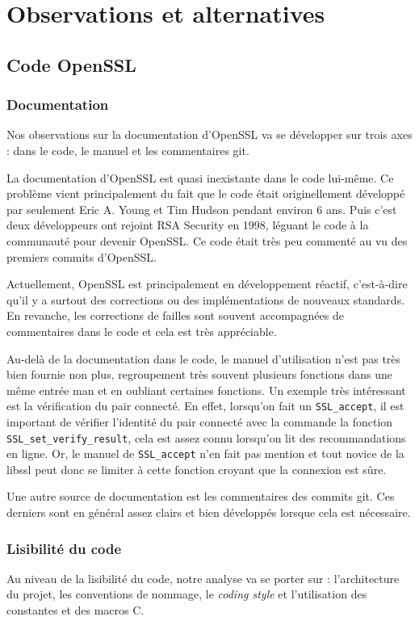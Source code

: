 \chapter{Observations et alternatives}
\section{Code OpenSSL}

\subsection{Documentation}
Nos observations sur la documentation d'OpenSSL va se développer sur trois axes : dans le code, le manuel et les commentaires git.

La documentation d'OpenSSL est quasi inexistante dans le code lui-même. 
Ce problème vient principalement du fait que le code était originellement développé par seulement Eric A. Young et Tim Hudson pendant environ 6 ans. Puis c'est deux développeurs ont rejoint RSA Security en 1998, léguant le code à la communauté pour devenir OpenSSL. Ce code était très peu commenté au vu des premiers commits d'OpenSSL. 

Actuellement, OpenSSL est principalement en développement réactif, c'est-à-dire qu'il y a surtout des corrections ou des implémentations de nouveaux standards. En revanche, les corrections de failles sont souvent accompagnées de commentaires dans le code et cela est très appréciable.

Au-delà de la documentation dans le code, le manuel d'utilisation n'est pas très bien fournie non plus, regroupement très souvent plusieurs fonctions dans une même entrée man et en oubliant certaines fonctions. Un exemple très intéressant est la vérification du pair connecté. En effet, lorsqu'on fait un \verb+SSL_accept+, il est important de vérifier l'identité du pair connecté avec la commande la fonction \verb+SSL_set_verify_result+, cela est assez connu lorsqu'on lit des recommandations en ligne. Or, le manuel de \verb+SSL_accept+ n'en fait pas mention et tout novice de la libssl peut donc se limiter à cette fonction croyant que la connexion est sûre.

Une autre source de documentation est les commentaires des commits git. Ces derniers sont en général assez clairs et bien développés lorsque cela est nécessaire.

\subsection{Lisibilité du code}
Au niveau de la lisibilité du code, notre analyse va se porter sur : l'architecture du projet, les conventions de nommage, le \textit{coding style} et l'utilisation des constantes et des macros C.

